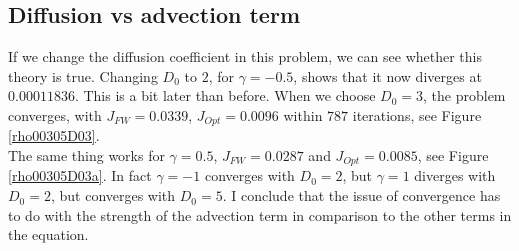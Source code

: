 \documentclass[11pt, a4paper]{article}
\theoremstyle{definition}
\begin{document}
\subsection{Diffusion vs advection term}
If we change the diffusion coefficient in this problem, we can see whether this theory is true.
Changing $D_0$ to $2$, for $\gamma = - 0.5$, shows that it now diverges at $0.00011836$. This is a bit later than before. When we choose $D_0 = 3$, the problem converges, with $J_{FW} = 0.0339$, $J_{Opt}= 0.0096$ within $787$ iterations, see Figure \ref{rho00305D03}.\\
The same thing works for $\gamma = 0.5$, $J_{FW} = 0.0287$ and $J_{Opt} = 0.0085$, see Figure \ref{rho00305D03a}. In fact $\gamma = -1$ converges with $D_0 =2$, but $\gamma = 1$ diverges with $D_0 = 2$, but converges with $D_0=5$. I conclude that the issue of convergence has to do with the strength of the advection term in comparison to the other terms in the equation.
\end{document}
